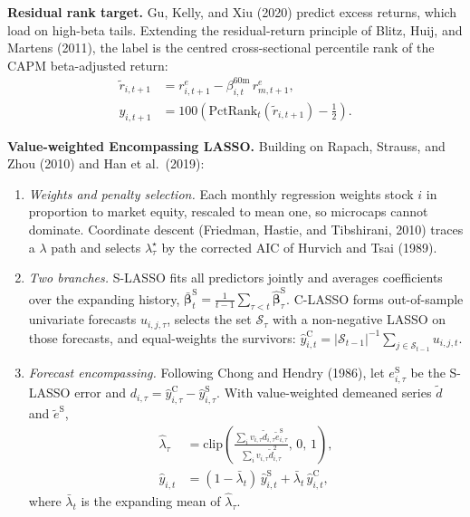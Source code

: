 \documentclass[10pt,twocolumn,letterpaper]{article}
\begin{document}
\textbf{Residual rank target.} Gu, Kelly, and Xiu (2020) predict excess returns, which load on high-beta tails. Extending the residual-return principle of Blitz, Huij, and Martens (2011), the label is the centred cross-sectional percentile rank of the CAPM beta-adjusted return:
\begin{align}
\tilde{r}_{i,t+1} &= r_{i,t+1}^e - \beta_{i,t}^{60\text{m}}\, r_{m,t+1}^e, \nonumber\\
y_{i,t+1} &= 100\left(\mathrm{PctRank}_t(\tilde{r}_{i,t+1}) - \tfrac{1}{2}\right). \label{eq:resrank}
\end{align}

\textbf{Value-weighted Encompassing LASSO.} Building on Rapach, Strauss, and Zhou (2010) and Han et al.\ (2019):
\begin{enumerate}
\item \textit{Weights and penalty selection.} Each monthly regression weights stock $i$ in proportion to market equity, rescaled to mean one, so microcaps cannot dominate. Coordinate descent (Friedman, Hastie, and Tibshirani, 2010) traces a $\lambda$ path and selects $\lambda_\tau^\star$ by the corrected AIC of Hurvich and Tsai (1989).
\item \textit{Two branches.} S-LASSO fits all predictors jointly and averages coefficients over the expanding history, $\bar{\bm{\beta}}_t^{\text{S}} = \frac{1}{t-1}\sum_{\tau<t}\hat{\bm{\beta}}_\tau^{\text{S}}$. C-LASSO forms out-of-sample univariate forecasts $u_{i,j,\tau}$, selects the set $\mathcal{S}_\tau$ with a non-negative LASSO on those forecasts, and equal-weights the survivors: $\hat{y}_{i,t}^{\text{C}} = |\mathcal{S}_{t-1}|^{-1}\sum_{j \in \mathcal{S}_{t-1}} u_{i,j,t}$.
\item \textit{Forecast encompassing.} Following Chong and Hendry (1986), let $e_{i,\tau}^{\text{S}}$ be the S-LASSO error and $d_{i,\tau} = \hat{y}_{i,\tau}^{\text{C}} - \hat{y}_{i,\tau}^{\text{S}}$. With value-weighted demeaned series $\tilde{d}$ and $\tilde{e}^{\text{S}}$,
\begin{align}
\hat{\lambda}_{\tau} &= \mathrm{clip}\!\left(\frac{\sum_i v_{i,\tau}\tilde{d}_{i,\tau}\tilde{e}_{i,\tau}^{\text{S}}}{\sum_i v_{i,\tau}\tilde{d}_{i,\tau}^2},\, 0,\, 1\right), \nonumber\\
\hat{y}_{i,t} &= (1 - \bar{\lambda}_t)\,\hat{y}_{i,t}^{\text{S}} + \bar{\lambda}_t\,\hat{y}_{i,t}^{\text{C}}, \label{eq:elasso}
\end{align}
where $\bar{\lambda}_t$ is the expanding mean of $\hat{\lambda}_{\tau}$.
\end{enumerate}
\end{document}
